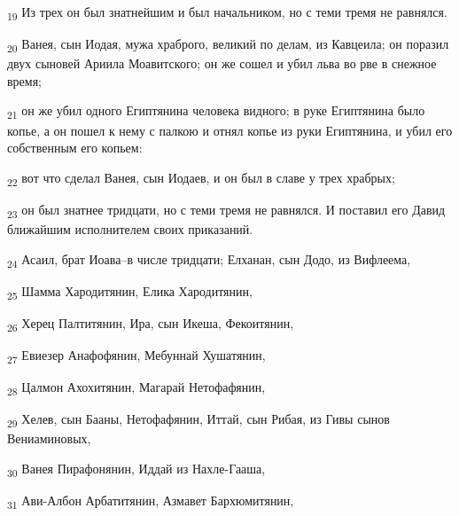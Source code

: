 \begin{tcolorbox}
\textsubscript{19} Из трех он был знатнейшим и был начальником, но с теми тремя не равнялся.
\end{tcolorbox}
\begin{tcolorbox}
\textsubscript{20} Ванея, сын Иодая, мужа храброго, великий по делам, из Кавцеила; он поразил двух сыновей Ариила Моавитского; он же сошел и убил льва во рве в снежное время;
\end{tcolorbox}
\begin{tcolorbox}
\textsubscript{21} он же убил одного Египтянина человека видного; в руке Египтянина было копье, а он пошел к нему с палкою и отнял копье из руки Египтянина, и убил его собственным его копьем:
\end{tcolorbox}
\begin{tcolorbox}
\textsubscript{22} вот что сделал Ванея, сын Иодаев, и он был в славе у трех храбрых;
\end{tcolorbox}
\begin{tcolorbox}
\textsubscript{23} он был знатнее тридцати, но с теми тремя не равнялся. И поставил его Давид ближайшим исполнителем своих приказаний.
\end{tcolorbox}
\begin{tcolorbox}
\textsubscript{24} Асаил, брат Иоава--в числе тридцати; Елханан, сын Додо, из Вифлеема,
\end{tcolorbox}
\begin{tcolorbox}
\textsubscript{25} Шамма Хародитянин, Елика Хародитянин,
\end{tcolorbox}
\begin{tcolorbox}
\textsubscript{26} Херец Палтитянин, Ира, сын Икеша, Фекоитянин,
\end{tcolorbox}
\begin{tcolorbox}
\textsubscript{27} Евиезер Анафофянин, Мебуннай Хушатянин,
\end{tcolorbox}
\begin{tcolorbox}
\textsubscript{28} Цалмон Ахохитянин, Магарай Нетофафянин,
\end{tcolorbox}
\begin{tcolorbox}
\textsubscript{29} Хелев, сын Бааны, Нетофафянин, Иттай, сын Рибая, из Гивы сынов Вениаминовых,
\end{tcolorbox}
\begin{tcolorbox}
\textsubscript{30} Ванея Пирафонянин, Иддай из Нахле-Гааша,
\end{tcolorbox}
\begin{tcolorbox}
\textsubscript{31} Ави-Албон Арбатитянин, Азмавет Бархюмитянин,
\end{tcolorbox}

